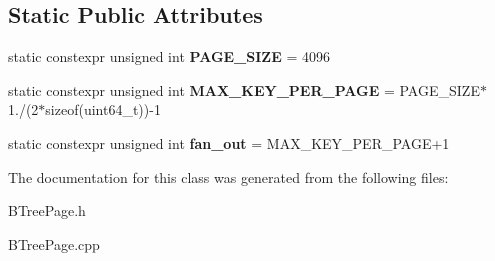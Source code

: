 \subsection*{Static Public Attributes}
\begin{DoxyCompactItemize}
\item 
\hypertarget{class_b_tree_page_ab446693b95b661587c0699cadda63644}{}static constexpr unsigned int {\bfseries P\+A\+G\+E\+\_\+\+S\+I\+Z\+E} = 4096\label{class_b_tree_page_ab446693b95b661587c0699cadda63644}

\item 
\hypertarget{class_b_tree_page_a30db9179507a56b19f633b210bc1369d}{}static constexpr unsigned int {\bfseries M\+A\+X\+\_\+\+K\+E\+Y\+\_\+\+P\+E\+R\+\_\+\+P\+A\+G\+E} = P\+A\+G\+E\+\_\+\+S\+I\+Z\+E$\ast$1./(2$\ast$sizeof(uint64\+\_\+t))-\/1\label{class_b_tree_page_a30db9179507a56b19f633b210bc1369d}

\item 
\hypertarget{class_b_tree_page_ac82396e8a895f09d853882a4673c5081}{}static constexpr unsigned int {\bfseries fan\+\_\+out} = M\+A\+X\+\_\+\+K\+E\+Y\+\_\+\+P\+E\+R\+\_\+\+P\+A\+G\+E+1\label{class_b_tree_page_ac82396e8a895f09d853882a4673c5081}

\end{DoxyCompactItemize}


The documentation for this class was generated from the following files\+:\begin{DoxyCompactItemize}
\item 
B\+Tree\+Page.\+h\item 
B\+Tree\+Page.\+cpp\end{DoxyCompactItemize}
